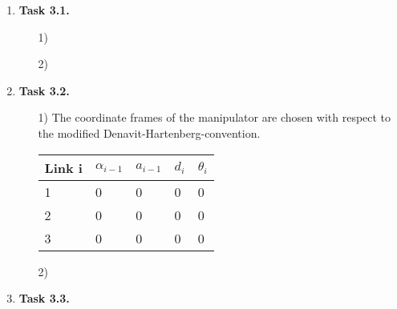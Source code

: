 \documentclass[a4paper,11pt]{article}
\author{\authorinfo}
\title{\titleinfo}
\date{\today}
\begin{document}
\maketitle
\begin {enumerate}
\item[\textbf{Task 3.1.}]

    \begin{enumerate}
        \item[1)]
        \item[2)]
    \end{enumerate}

\item[\textbf{Task 3.2.}]

    \begin{enumerate}
        \item[1)] The coordinate frames of the manipulator are chosen with respect to the modified Denavit-Hartenberg-convention.
        \begin{table}[h]
          \begin{tabular}{l|llll}
            \hline
            Link i & $\alpha_{i-1}$ & $a_{i-1}$ & $d_i$ & $\theta_i$\\
            \hline
            1 & 0 & 0 & 0 & 0\\
            2 & 0 & 0 & 0 & 0\\
            3 & 0 & 0 & 0 & 0\\
            \hline
          \end{tabular}
        \end{table}


        \item[2)]
    \end{enumerate}

\item[\textbf{Task 3.3.}]


\end{enumerate}
\end{document}
